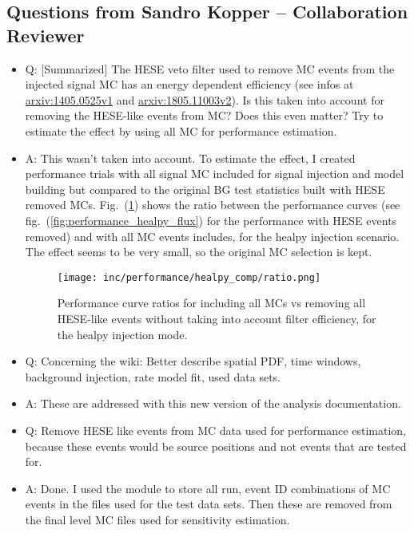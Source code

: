 \subsection*{Questions from Sandro Kopper -- Collaboration Reviewer}
  \begin{itemize}
      \item Q: [Summarized] The HESE veto filter used to remove MC events from the injected signal MC has an energy dependent efficiency (see infos at \href{http://arxiv.org/abs/1405.0525v1}{arxiv:1405.0525v1} and \href{https://arxiv.org/abs/1805.11003v2}{arxiv:1805.11003v2}). Is this taken into account for removing the HESE-like events from MC?
      Does this even matter?
      Try to estimate the effect by using all MC for performance estimation.
      \item A: This wasn't taken into account. To estimate the effect, I created performance trials with all signal MC included for signal injection and model building but compared to the original BG test statistics built with HESE removed MCs.
      Fig.~(\ref{fig:performance_ratios_healpy_flux}) shows the ratio between the performance curves (see fig.~(\ref{fig:performance_healpy_flux}) for the performance with HESE events removed) and with all MC events includes, for the healpy injection scenario.
      The effect seems to be very small, so the original MC selection is kept.
      \begin{figure}[htbp]
        \centering
        \texttt{[image: inc/performance/healpy\_comp/ratio.png]}
        \caption{Performance curve ratios for including all MCs vs removing all HESE-like events without taking into account filter efficiency, for the healpy injection mode.}
        \label{fig:performance_ratios_healpy_flux}
      \end{figure}

      \item Q:
        Concerning the wiki: Better describe spatial PDF, time windows, background injection, rate model fit, used data sets.
      \item A:
        These are addressed with this new version of the analysis documentation.

      \item Q:
        Remove HESE like events from MC data used for performance estimation, because these events would be source positions and not events that are tested for.
      \item A:
        Done.
        I used the  module to store all run, event ID combinations of MC events in the  files used for the test data sets.
        Then these are removed from the final level MC files used for sensitivity estimation.


\end{itemize}
